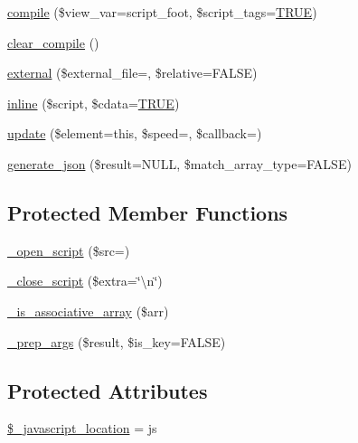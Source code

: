 \begin{DoxyCompactItemize}
\item 
\mbox{\hyperlink{class_c_i___javascript_a16edc3063561b4940ebde2714b1b75f4}{compile}} (\$view\+\_\+var=\textquotesingle{}script\+\_\+foot\textquotesingle{}, \$script\+\_\+tags=\mbox{\hyperlink{constants_8php_ae04a3efe6aa42044f803ee90c2277846}{T\+R\+UE}})
\item 
\mbox{\hyperlink{class_c_i___javascript_a4e3a7e7ffc20e8f578a0d66f52def10d}{clear\+\_\+compile}} ()
\item 
\mbox{\hyperlink{class_c_i___javascript_a1b1cfdf25c7ceae03d2c60019bdf59b9}{external}} (\$external\+\_\+file=\textquotesingle{}\textquotesingle{}, \$relative=F\+A\+L\+SE)
\item 
\mbox{\hyperlink{class_c_i___javascript_aeecd5d85370a4037c00dba82960816e1}{inline}} (\$script, \$cdata=\mbox{\hyperlink{constants_8php_ae04a3efe6aa42044f803ee90c2277846}{T\+R\+UE}})
\item 
\mbox{\hyperlink{class_c_i___javascript_a97c369870fff724c8bbdae779a715446}{update}} (\$element=\textquotesingle{}this\textquotesingle{}, \$speed=\textquotesingle{}\textquotesingle{}, \$callback=\textquotesingle{}\textquotesingle{})
\item 
\mbox{\hyperlink{class_c_i___javascript_ae60bb50a1e4cbbce1f6c29a73fad5e07}{generate\+\_\+json}} (\$result=N\+U\+LL, \$match\+\_\+array\+\_\+type=F\+A\+L\+SE)
\end{DoxyCompactItemize}
\subsection*{Protected Member Functions}
\begin{DoxyCompactItemize}
\item 
\mbox{\hyperlink{class_c_i___javascript_ab90b7bf672ff305aa302ced7c8255762}{\+\_\+open\+\_\+script}} (\$src=\textquotesingle{}\textquotesingle{})
\item 
\mbox{\hyperlink{class_c_i___javascript_a83a39b1edd6e0ec9bd6c93de99a0d4d8}{\+\_\+close\+\_\+script}} (\$extra=\char`\"{}\textbackslash{}n\char`\"{})
\item 
\mbox{\hyperlink{class_c_i___javascript_aa37c9b1b7e2898fe21a0deaace09b156}{\+\_\+is\+\_\+associative\+\_\+array}} (\$arr)
\item 
\mbox{\hyperlink{class_c_i___javascript_a10b9bc25e0d84b0dacb1bd7b09f3c0be}{\+\_\+prep\+\_\+args}} (\$result, \$is\+\_\+key=F\+A\+L\+SE)
\end{DoxyCompactItemize}
\subsection*{Protected Attributes}
\begin{DoxyCompactItemize}
\item 
\mbox{\hyperlink{class_c_i___javascript_a1ade0f4214435ac22074136db49cc257}{\$\+\_\+javascript\+\_\+location}} = \textquotesingle{}js\textquotesingle{}
\end{DoxyCompactItemize}


